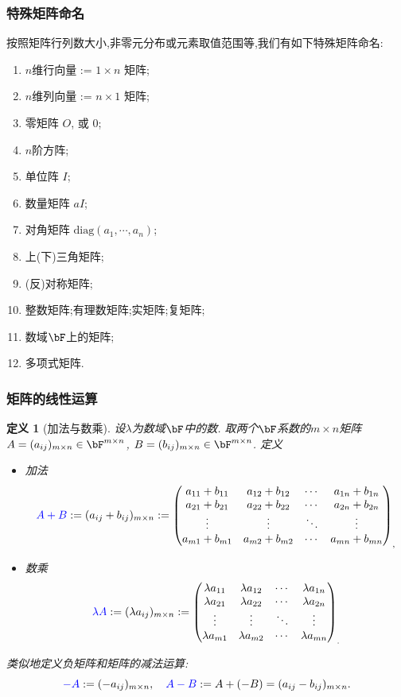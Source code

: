 \documentclass{article}
\newtheorem{definition}[theorem]{定义}
\renewcommand{\blue }[1]{{\textcolor[rgb]{0,0,1}{#1}}}
\begin{document}
\subsubsection{特殊矩阵命名}
按照矩阵行列数大小,非零元分布或元素取值范围等,我们有如下特殊矩阵命名:
\begin{enumerate}
\item $n$维\blue{行向量} := $1\times n$ 矩阵;
\item $n$维\blue{列向量} := $n\times 1$ 矩阵;
\item \blue{零矩阵} $O$, 或 $0$;
\item $n$阶\blue{方阵};
\item \blue{单位阵} $I$;
\item \blue{数量矩阵} $aI$;
\item \blue{对角矩阵} $\mathrm{diag}(a_1,\cdots,a_n)$;
\item \blue{上(下)三角矩阵};
\item \blue{(反)对称矩阵};
\item \blue{整数矩阵};\blue{有理数矩阵};\blue{实矩阵};\blue{复矩阵};
\item \blue{数域$\bF$上的矩阵};
\item \blue{多项式矩阵}.
\end{enumerate}

\subsubsection{矩阵的线性运算}
\begin{definition}[加法与数乘] 设$\lambda$为数域$\bF$中的数. 取两个$\bF$系数的$m\times n$矩阵 $A=(a_{ij})_{m\times n}\in \bF^{m\times n}$, $B=(b_{ij})_{m\times n}\in \bF^{m\times n}$.   定义
\begin{itemize}
\item \blue{加法}
\[\blue{A + B} :=(a_{ij}+b_{ij})_{m\times n}:=\begin{pmatrix}
a_{11}+b_{11} & a_{12}+b_{12} & \cdots & a_{1 n}+b_{1n}\\
a_{21}+b_{21} & a_{22}+b_{22} & \cdots & a_{2 n}+b_{2n}\\
\vdots & \vdots & \ddots & \vdots\\
a_{m 1}+b_{m1} & a_{m 2}+b_{m2} & \cdots & a_{mn}+b_{mn}
\end{pmatrix}_,\]
\item \blue{数乘}
\[\blue{\lambda A} :=(\lambda a_{ij})_{m\times n}:=\begin{pmatrix}
\lambda a_{11} & \lambda a_{12} & \cdots & \lambda a_{1 n}\\
\lambda a_{21} & \lambda a_{22} & \cdots & \lambda a_{2 n}\\
\vdots & \vdots & \ddots & \vdots\\
\lambda a_{m 1} & \lambda a_{m 2} & \cdots & \lambda a_{mn}
\end{pmatrix}_.\]
\end{itemize}
类似地定义\blue{负矩阵}和矩阵的\blue{减法}运算:
\[\blue{-A}:=(-a_{ij})_{m\times n}, \quad \blue{A-B}:=A+(-B) = (a_{ij}-b_{ij})_{m\times n}.\]
\end{definition}
\end{document}
